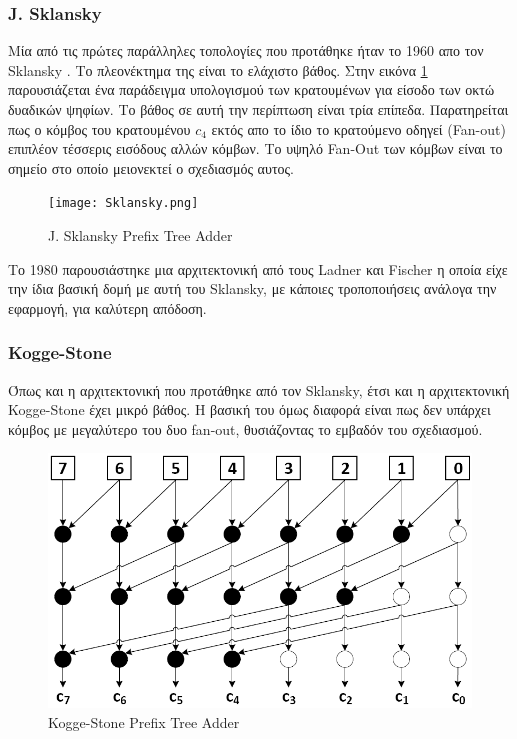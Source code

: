 \subsubsection*{J. Sklansky}
Μία από τις πρώτες παράλληλες τοπολογίες που προτάθηκε ήταν το 1960 απο τον Sklansky \cite{5219822}. Το πλεονέκτημα της είναι το ελάχιστο βάθος. Στην εικόνα \ref{SklanskyTree} παρουσιάζεται ένα παράδειγμα υπολογισμού των κρατουμένων για είσοδο των οκτώ δυαδικών ψηφίων. Το βάθος σε αυτή την περίπτωση είναι τρία επίπεδα. Παρατηρείται πως ο κόμβος του κρατουμένου $c_4$ εκτός απο το ίδιο το κρατούμενο οδηγεί (Fan-out) επιπλέον τέσσερις εισόδους αλλών κόμβων. Το υψηλό Fan-Out των κόμβων είναι το σημείο στο οποίο μειονεκτεί ο σχεδιασμός αυτος.
\begin{figure}[H]
    \centering
    \texttt{[image: Sklansky.png]}
    \caption{J. Sklansky Prefix Tree Adder}
    \label{SklanskyTree}
\end{figure}
Το 1980 παρουσιάστηκε μια αρχιτεκτονική από τους Ladner και Fischer 
\cite{Ladner:1980:PPC:322217.322232} η οποία είχε την ίδια βασική δομή με αυτή του
Sklansky, με κάποιες τροποποιήσεις ανάλογα την εφαρμογή, για καλύτερη απόδοση.





\subsubsection*{Kogge-Stone}
Όπως και η αρχιτεκτονική που προτάθηκε από τον Sklansky, έτσι και η αρχιτεκτονική
Kogge-Stone \cite{5009159} έχει μικρό βάθος. Η βασική του όμως διαφορά είναι πως δεν υπάρχει 
κόμβος με μεγαλύτερο του δυο fan-out, θυσιάζοντας το εμβαδόν του σχεδιασμού.
\begin{figure}[H]
    \centering
    \includegraphics[scale=0.45]{Pictures/Kogge-Stone.png}
    \caption{Kogge-Stone Prefix Tree Adder}
    \label{Kogge-StoneTree}
\end{figure}






